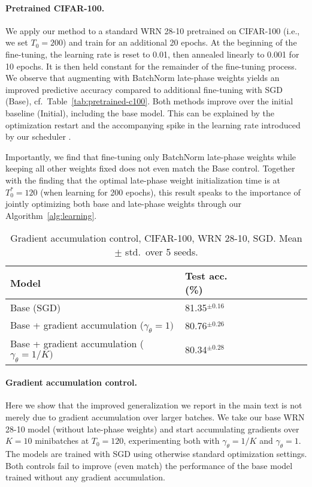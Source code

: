 \documentclass{article} \usepackage{iclr2021_conference,times}
\begin{document}
\paragraph{Pretrained CIFAR-100.}
We apply our method to a standard WRN 28-10 pretrained on CIFAR-100 (i.e., we set $T_0=200$) and train for an additional 20 epochs. At the beginning of the fine-tuning, the learning rate is reset to 0.01, then annealed linearly to 0.001 for 10 epochs. It is then held constant for the remainder of the fine-tuning process. We observe that augmenting with BatchNorm late-phase weights yields an improved predictive accuracy compared to additional fine-tuning with SGD (Base), cf.~Table~\ref{tab:pretrained-c100}. Both methods improve over the initial baseline (Initial), including the base model. This can be explained by the optimization restart and the accompanying spike in the learning rate introduced by our scheduler \citep{loshchilov_sgdr_2017}.



Importantly, we find that fine-tuning only BatchNorm late-phase weights while keeping all other weights fixed does not even match the Base control. Together with the finding that the optimal late-phase weight initialization time is at $T_0^*=120$ (when learning for 200 epochs), this result speaks to the importance of jointly optimizing both base and late-phase weights through our Algorithm~\ref{alg:learning}.


\begin{table}
\centering
  \caption{Gradient accumulation control, CIFAR-100, WRN 28-10, SGD. Mean $\pm$ std.~over 5 seeds.}
  \label{tab:gead-control}
  \vspace{-0.2cm}
  \centering
  {\renewcommand{\arraystretch}{1.1}\setlength{\tabcolsep}{4pt}
  \begin{tabular}{@{}llllllll@{}} 
    \toprule
Model & Test acc. (\%) \\\midrule
Base (SGD)      &  81.35$^{\pm 0.16}$     \\
Base + gradient accumulation ($\gamma_\theta=1)$   & 80.76$^{\pm 0.26}$   \\
Base + gradient accumulation ($\gamma_\theta=1/K)$  & 80.34$^{\pm 0.28}$      \\\bottomrule
    \end{tabular}}
\end{table}

\paragraph{Gradient accumulation control.} Here we show that the improved generalization we report in the main text is not merely due to gradient accumulation over larger batches. We take our base WRN 28-10 model (without late-phase weights) and start accumulating gradients over $K=10$ minibatches at $T_0=120$, experimenting both with $\gamma_\theta=1/K$ and $\gamma_\theta=1$. The models are trained with SGD using otherwise standard optimization settings. Both controls fail to improve (even match) the performance of the base model trained without any gradient accumulation.
\end{document}
